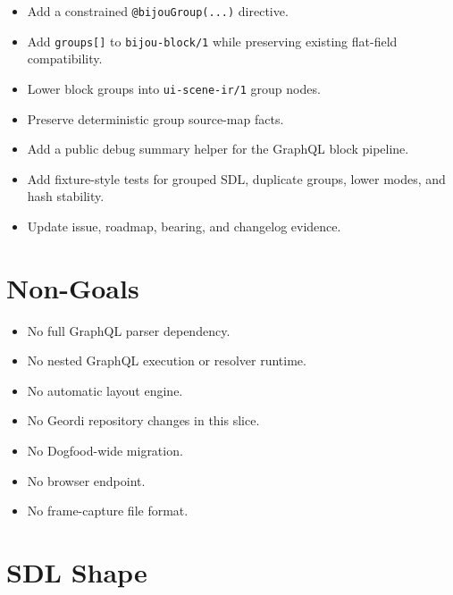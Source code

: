 \begin{itemize}
\tightlist
\item
  Add a constrained \texttt{@\allowbreak{}b\allowbreak{}i\allowbreak{}j\allowbreak{}o\allowbreak{}u\allowbreak{}G\allowbreak{}r\allowbreak{}o\allowbreak{}u\allowbreak{}p\allowbreak{}(\allowbreak{}.\allowbreak{}.\allowbreak{}.\allowbreak{})} directive.
\item
  Add \texttt{g\allowbreak{}r\allowbreak{}o\allowbreak{}u\allowbreak{}p\allowbreak{}s\allowbreak{}[\allowbreak{}]} to \texttt{b\allowbreak{}i\allowbreak{}j\allowbreak{}o\allowbreak{}u\allowbreak{}-\allowbreak{}b\allowbreak{}l\allowbreak{}o\allowbreak{}c\allowbreak{}k\allowbreak{}/\allowbreak{}1} while preserving existing flat-field compatibility.
\item
  Lower block groups into \texttt{u\allowbreak{}i\allowbreak{}-\allowbreak{}s\allowbreak{}c\allowbreak{}e\allowbreak{}n\allowbreak{}e\allowbreak{}-\allowbreak{}i\allowbreak{}r\allowbreak{}/\allowbreak{}1} group nodes.
\item
  Preserve deterministic group source-map facts.
\item
  Add a public debug summary helper for the GraphQL block pipeline.
\item
  Add fixture-style tests for grouped SDL, duplicate groups, lower modes, and hash stability.
\item
  Update issue, roadmap, bearing, and changelog evidence.
\end{itemize}

\section{Non-Goals}\label{record-141-non-goals}

\begin{itemize}
\tightlist
\item
  No full GraphQL parser dependency.
\item
  No nested GraphQL execution or resolver runtime.
\item
  No automatic layout engine.
\item
  No Geordi repository changes in this slice.
\item
  No Dogfood-wide migration.
\item
  No browser endpoint.
\item
  No frame-capture file format.
\end{itemize}

\section{SDL Shape}\label{record-141-sdl-shape}

